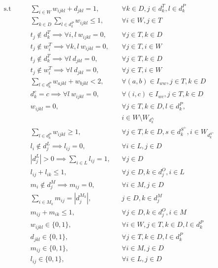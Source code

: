 \documentclass[../../thesis.tex]{subfiles}
\begin{document}
\begin{align*}
    \textrm{s.t} \qquad & \sum_{i \in W} w_{ijkl} + d_{jkl} = 1, && \forall k \in D, j \in d_k^T, l \in d_k^P \\
    & \sum_{k \in D} \sum_{l \in d_k^P} w_{ijkl} \leq 1, && \forall i \in W, j \in T  \\
    & t_j \notin d^T_{k} \implies \forall i, l \ w_{ijkl} = 0,  && \forall j \in T , k \in D \\
    & t_j \notin w^T_{i} \implies \forall k, l \ w_{ijkl} = 0, && \forall j \in T, i \in W  \\ 
    & t_j \notin d^T_{k} \implies \forall l \ d_{jkl} = 0,  && \forall j \in T , k \in D  \\
    & t_j \notin w^T_{i} \implies \forall l \ d_{jkl} = 0, && \forall j \in T, i \in W  \\ 
    & \sum_{l \in d^P_k} w_{ajkl} + w_{bjkl} < 2, &&  \forall {(a, b) \in I_{ww}}, j \in T, k \in D \\
    & d^c_{k} = c \implies \forall l \ w_{ijkl} = 0, && \forall {(i, c) \in I_{wc}}, j \in T, k \in D  \\ 
    & w_{ijkl} = 0, && \forall j \in T, k \in D, l \in d^P_k,  \\
    & && i \in W \setminus W_{d^{s_l}_k} \\
    & \sum_{l \in d_k^P} w_{ijkl} \geq 1, && \forall j \in T, k \in D, s \in d^{S^+}_k, i \in W_{d^{S^+}_k}  \\
    & l_i \notin d^L_j \implies l_{ij} = 0, && \forall i \in L, j \in D   \\
    & |d^L_j| > 0 \implies \sum_{i \in L} l_{ij} = 1, && \forall j \in D \\
    & l_{ij} + l_{ik} \leq 1, && \forall j \in D, k \in d^O_j, i \in L \\
    & m_i \notin d^M_j \implies m_{ij} = 0, && \forall i \in M, j \in D   \\
    & \sum_{i \in M_k} m_{ij} = |d^{M_k}_j|, && j \in D, k \in d^M_j  \\
    & m_{ij} + m_{ik} \leq 1, && \forall j \in D, k \in d^O_j, i \in M  \\
    & w_{ijkl} \in \{0, 1\}, && \forall i \in W, j \in T, k \in D, l \in d^P_k  \\
    & d_{jkl} \in \{0, 1\}, && \forall j \in T, k \in D, l \in d^P_k  \\
    & m_{ij} \in \{0, 1\}, && \forall i \in M, j \in D  \\ 
    & l_{ij} \in \{0, 1\}, && \forall i \in L, j \in D  
\end{align*}
\endgroup
\end{document}
